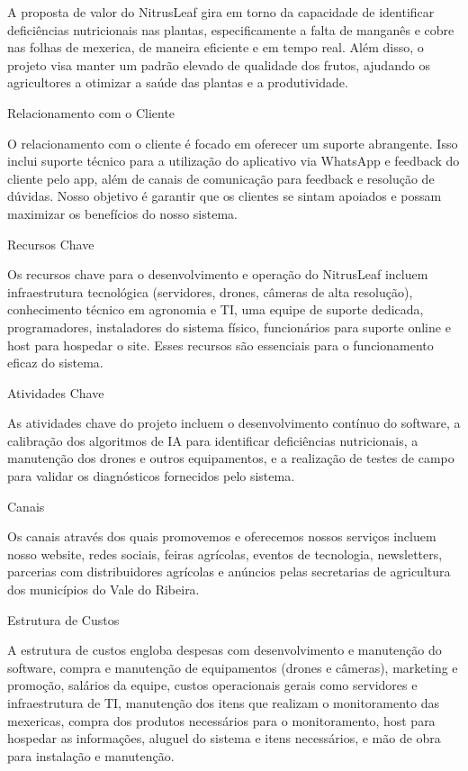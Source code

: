     A proposta de valor do NitrusLeaf gira em torno da capacidade de identificar deficiências nutricionais nas plantas, especificamente a falta de manganês e cobre nas folhas de mexerica, de maneira eficiente e em tempo real. Além disso, o projeto visa manter um padrão elevado de qualidade dos frutos, ajudando os agricultores a otimizar a saúde das plantas e a produtividade.
    
    Relacionamento com o Cliente
    
    O relacionamento com o cliente é focado em oferecer um suporte abrangente. Isso inclui suporte técnico para a utilização do aplicativo via WhatsApp e feedback do cliente pelo app, além de canais de comunicação para feedback e resolução de dúvidas. Nosso objetivo é garantir que os clientes se sintam apoiados e possam maximizar os benefícios do nosso sistema.
    
    Recursos Chave
    
    Os recursos chave para o desenvolvimento e operação do NitrusLeaf incluem infraestrutura tecnológica (servidores, drones, câmeras de alta resolução), conhecimento técnico em agronomia e TI, uma equipe de suporte dedicada, programadores, instaladores do sistema físico, funcionários para suporte online e host para hospedar o site. Esses recursos são essenciais para o funcionamento eficaz do sistema.
    
    Atividades Chave
    
    As atividades chave do projeto incluem o desenvolvimento contínuo do software, a calibração dos algoritmos de IA para identificar deficiências nutricionais, a manutenção dos drones e outros equipamentos, e a realização de testes de campo para validar os diagnósticos fornecidos pelo sistema.
    
    Canais
    
    Os canais através dos quais promovemos e oferecemos nossos serviços incluem nosso website, redes sociais, feiras agrícolas, eventos de tecnologia, newsletters, parcerias com distribuidores agrícolas e anúncios pelas secretarias de agricultura dos municípios do Vale do Ribeira.
    
    Estrutura de Custos
    
    A estrutura de custos engloba despesas com desenvolvimento e manutenção do software, compra e manutenção de equipamentos (drones e câmeras), marketing e promoção, salários da equipe, custos operacionais gerais como servidores e infraestrutura de TI, manutenção dos itens que realizam o monitoramento das mexericas, compra dos produtos necessários para o monitoramento, host para hospedar as informações, aluguel do sistema e itens necessários, e mão de obra para instalação e manutenção.
    
